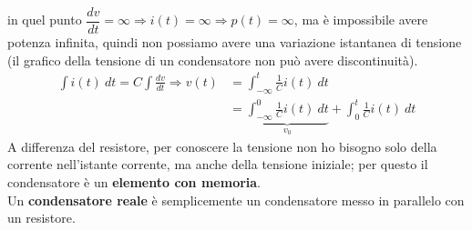 \documentclass{article}
\begin{document}
in quel punto $\dfrac{dv}{dt}=\infty \Rightarrow i(t)=\infty \Rightarrow p(t) = \infty$, ma è impossibile avere potenza infinita, quindi non possiamo avere una variazione istantanea di tensione (il grafico della tensione di un condensatore non può avere discontinuità).
\begin{align*}
    \int i(t) \ dt = C \int \frac{dv}{dt}\Longrightarrow v(t) &= \int_{- \infty}^{t} \frac{1}{C} i(t) \ dt\\
    &= \underbrace{\int_{- \infty}^{0} \frac{1}{C}i(t) \ dt}_{v_0} + \int_{0}^{t} \frac{1}{C} i(t) \ dt
\end{align*}
A differenza del resistore, per conoscere la tensione non ho bisogno solo della corrente nell'istante corrente, ma anche della tensione iniziale; per questo il condensatore è un \textbf{elemento con memoria}.
\vspace*{0.2cm}\\
Un \textbf{condensatore reale} è semplicemente un condensatore messo in parallelo con un resistore.
\end{document}
